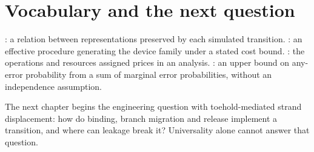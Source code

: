 \section{Vocabulary and the next question}
: a relation between representations preserved
by each simulated transition. : an effective
procedure generating the device family under a stated cost bound.
: the operations and resources assigned prices in an analysis.
: an upper bound on any-error probability from a sum of
marginal error probabilities, without an independence assumption.

The next chapter begins the engineering question with toehold-mediated strand
displacement: how do binding, branch migration and release implement a
transition, and where can leakage break it? Universality alone cannot answer
that question.
